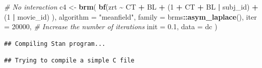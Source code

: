 \documentclass[
]{article}
\newenvironment{Shaded}{\begin{snugshade}}{\end{snugshade}}
\newcommand{\AttributeTok}[1]{\textcolor[rgb]{0.13,0.29,0.53}{#1}}
\newcommand{\CommentTok}[1]{\textcolor[rgb]{0.56,0.35,0.01}{\textit{#1}}}
\newcommand{\DecValTok}[1]{\textcolor[rgb]{0.00,0.00,0.81}{#1}}
\newcommand{\FloatTok}[1]{\textcolor[rgb]{0.00,0.00,0.81}{#1}}
\newcommand{\FunctionTok}[1]{\textcolor[rgb]{0.13,0.29,0.53}{\textbf{#1}}}
\newcommand{\NormalTok}[1]{#1}
\newcommand{\OtherTok}[1]{\textcolor[rgb]{0.56,0.35,0.01}{#1}}
\newcommand{\SpecialCharTok}[1]{\textcolor[rgb]{0.81,0.36,0.00}{\textbf{#1}}}
\newcommand{\StringTok}[1]{\textcolor[rgb]{0.31,0.60,0.02}{#1}}
\begin{document}
\begin{Shaded}
\begin{Highlighting}[]
\CommentTok{\# No interaction}
\NormalTok{c4 }\OtherTok{\textless{}{-}} \FunctionTok{brm}\NormalTok{(}
  \FunctionTok{bf}\NormalTok{(zrt }\SpecialCharTok{\textasciitilde{}}\NormalTok{ CT }\SpecialCharTok{+}\NormalTok{ BL }\SpecialCharTok{+}
\NormalTok{       (}\DecValTok{1} \SpecialCharTok{+}\NormalTok{ CT }\SpecialCharTok{+}\NormalTok{ BL }\SpecialCharTok{|}\NormalTok{ subj\_id) }\SpecialCharTok{+}\NormalTok{ (}\DecValTok{1} \SpecialCharTok{|}\NormalTok{ movie\_id)}
\NormalTok{  ), }
  \AttributeTok{algorithm =} \StringTok{"meanfield"}\NormalTok{,}
  \AttributeTok{family =}\NormalTok{ brms}\SpecialCharTok{::}\FunctionTok{asym\_laplace}\NormalTok{(),}
  \AttributeTok{iter =} \DecValTok{20000}\NormalTok{, }\CommentTok{\# Increase the number of iterations}
  \AttributeTok{init =} \FloatTok{0.1}\NormalTok{,}
  \AttributeTok{data =}\NormalTok{ dc}
\NormalTok{)}
\end{Highlighting}
\end{Shaded}

\begin{verbatim}
## Compiling Stan program...
\end{verbatim}

\begin{verbatim}
## Trying to compile a simple C file
\end{verbatim}
\end{document}

